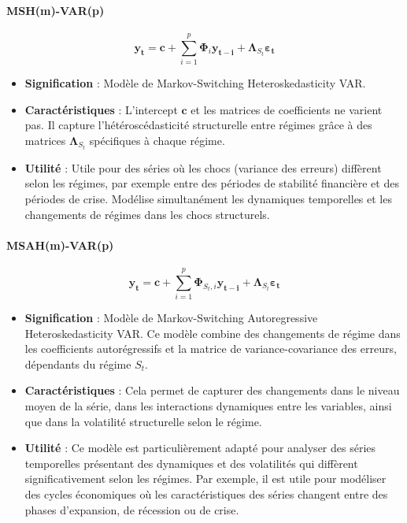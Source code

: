 \begin{sloppypar}
\paragraph{MSH(m)-VAR(p)}

\begin{equation}
    \bm{y_t} = \bm{c} + \sum_{i=1}^{p} \bm{\Phi}_i \bm{y_{t-i}} + \bm{\Lambda}_{S_t} \bm{\varepsilon_t} 
\end{equation}

\begin{itemize}
    \item \textbf{Signification} : Modèle de Markov-Switching Heteroskedasticity VAR.
    \item \textbf{Caractéristiques} :  L’intercept \(\bm{c}\) et les matrices de coefficients ne varient pas. Il capture l’hétéroscédasticité structurelle entre régimes grâce à des matrices \(\bm{\Lambda}_{S_t}\) spécifiques à chaque régime.
    \item \textbf{Utilité} : Utile pour des séries où les chocs (variance des erreurs) diffèrent selon les régimes, par exemple entre des périodes de stabilité financière et des périodes de crise. Modélise simultanément les dynamiques temporelles et les changements de régimes dans les chocs structurels.
\end{itemize}

\paragraph{MSAH(m)-VAR(p)}

\begin{equation}
    \bm{y_t} = \bm{c} + \sum_{i=1}^{p} \bm{\Phi}_{S_t,i} \bm{y_{t-i}} + \bm{\Lambda}_{S_t} \bm{\varepsilon_t}
\end{equation}

\begin{itemize}
    \item \textbf{Signification} : Modèle de Markov-Switching Autoregressive Heteroskedasticity VAR. Ce modèle combine des changements de régime dans  les coefficients autorégressifs et la matrice de variance-covariance des erreurs, dépendants du régime \(S_t\).
    \item \textbf{Caractéristiques} : Cela permet de capturer des changements dans le niveau moyen de la série, dans les interactions dynamiques entre les variables, ainsi que dans la volatilité structurelle selon le régime.
    \item \textbf{Utilité} : Ce modèle est particulièrement adapté pour analyser des séries temporelles présentant des dynamiques et des volatilités qui diffèrent significativement selon les régimes. Par exemple, il est utile pour modéliser des cycles économiques où les caractéristiques des séries changent entre des phases d’expansion, de récession ou de crise.
\end{itemize}


\end{sloppypar}

